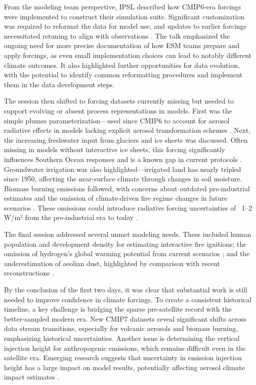 \documentclass{ametsocV6.1}
\begin{document}
From the modeling team perspective, IPSL described how CMIP6-era forcings were implemented to construct their simulation suite. Significant customization was required to reformat the data for model use, and updates to earlier forcings necessitated retuning to align with observations \citep{lurton_implementation_2020}. The talk emphasized the ongoing need for more precise documentation of how ESM teams prepare and apply forcings, as even small implementation choices can lead to notably different climate outcomes. It also highlighted further opportunities for data evolution, with the potential to identify common reformatting procedures and implement them in the data development steps. 

The session then shifted to forcing datasets currently missing but needed to support evolving or absent process representations in models. First was the simple plumes parameterization—used since CMIP6 to account for aerosol radiative effects in models lacking explicit aerosol transformation schemes \citep[e.g.,][]{stevens_macv2-sp_2017,fiedler_anthropogenic_2019}. Next, the increasing freshwater input from glaciers and ice sheets was discussed. Often missing in models without interactive ice sheets, this forcing significantly influences Southern Ocean responses and is a known gap in current protocols \citep[e.g.,][]{roach_winds_2023,schmidt_anomalous_2023}. Groundwater irrigation was also highlighted—irrigated land has nearly tripled since 1950, affecting the near-surface climate through changes in soil moisture. Biomass burning emissions followed, with concerns about outdated pre-industrial estimates and the omission of climate-driven fire regime changes in future scenarios \citep[e.g.,][]{chen_multi-decadal_2023,hamilton_global_2024}. These omissions could introduce radiative forcing uncertainties of ~1–2 W/m² from the pre-industrial era to today \citep{hamilton_reassessment_2018,wan_importance_2021}.

The final session addressed several unmet modeling needs. These included human population and development density for estimating interactive fire ignitions; the omission of hydrogen’s global warming potential from current scenarios \citep[e.g.,][]{sand_multi-model_2023}; and the underestimation of aeolian dust, highlighted by comparison with recent reconstructions \citep[e.g.,][]{kok_mineral_2023}.

By the conclusion of the first two days, it was clear that substantial work is still needed to improve confidence in climate forcings. To create a consistent historical timeline, a key challenge is bridging the sparse pre-satellite record with the better-sampled modern era. New CMIP7 datasets reveal significant shifts across data stream transitions, especially for volcanic aerosols and biomass burning, emphasizing historical uncertainties. Another issue is determining the vertical injection height for anthropogenic emissions, which remains difficult even in the satellite era. Emerging research suggests that uncertainty in emission injection height has a large impact on model results, potentially affecting aerosol climate impact estimates \citep[e.g.,][]{ahsan_emissions_2023}.
\end{document}
